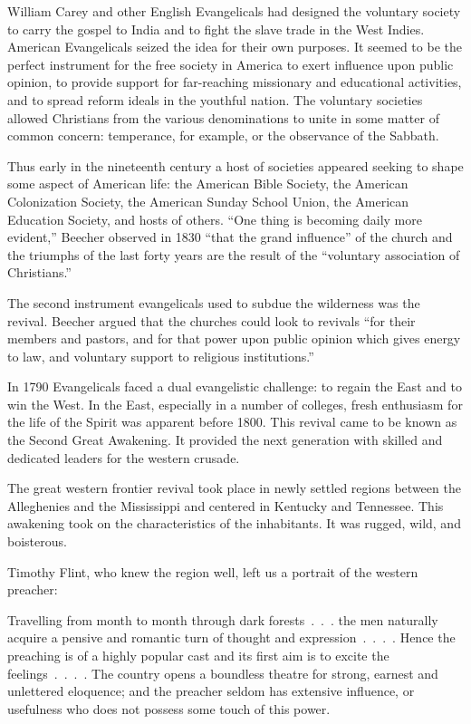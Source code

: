 William Carey and other English Evangelicals had designed the voluntary society to carry the gospel
to India and to fight the slave trade in the West Indies. American Evangelicals seized the idea for
their own purposes. It seemed to be the perfect instrument for the free society in America to exert
influence upon public opinion, to provide support for far-reaching missionary and educational
activities, and to spread reform ideals in the youthful nation. The voluntary societies allowed
Christians from the various denominations to unite in some matter of common concern: temperance, for
example, or the observance of the Sabbath.

Thus early in the nineteenth century a host of societies appeared seeking to shape some aspect of
American life: the American Bible Society, the American Colonization Society, the American Sunday
School Union, the American Education Society, and hosts of others. “One thing is becoming daily more
evident,” Beecher observed in 1830 “that the grand influence” of the church and the triumphs of the
last forty years are the result of the “voluntary association of Christians.”

The second instrument evangelicals used to subdue the wilderness was the revival. Beecher argued
that the churches could look to revivals “for their members and pastors, and for that power upon
public opinion which gives energy to law, and voluntary support to religious institutions.”

In 1790 Evangelicals faced a dual evangelistic challenge: to regain the East and to win the West. In
the East, especially in a number of colleges, fresh enthusiasm for the life of the Spirit was
apparent before 1800. This revival came to be known as the Second Great Awakening. It provided the
next generation with skilled and dedicated leaders for the western crusade.

The great western frontier revival took place in newly settled regions between the Alleghenies and
the Mississippi and centered in Kentucky and Tennessee. This awakening took on the characteristics
of the inhabitants. It was rugged, wild, and boisterous.

Timothy Flint, who knew the region well, left us a portrait of the western preacher:

\begin{blockquote}
Travelling from month to month through dark forests~.~.~. the men naturally acquire a pensive and
romantic turn of thought and expression~.~.~.~. Hence the preaching is of a highly popular cast and
its first aim is to excite the feelings~.~.~.~. The country opens a boundless theatre for strong,
earnest and unlettered eloquence; and the preacher seldom has extensive influence, or usefulness who
does not possess some touch of this power.
\end{blockquote}

